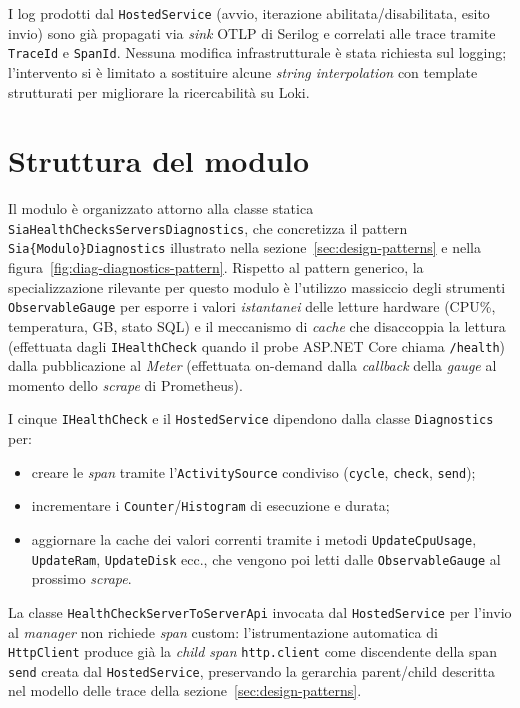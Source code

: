 I log prodotti dal \texttt{HostedService} (avvio, iterazione abilitata/disabilitata,
esito invio) sono già propagati via \emph{sink} OTLP di Serilog e correlati alle trace
tramite \texttt{TraceId} e \texttt{SpanId}. Nessuna modifica infrastrutturale è stata
richiesta sul logging; l'intervento si è limitato a sostituire alcune
\emph{string interpolation} con template strutturati per migliorare la ricercabilità su
Loki.

\section{Struttura del modulo}

Il modulo è organizzato attorno alla classe statica
\texttt{SiaHealthChecksServersDiagnostics}, che concretizza il pattern
\texttt{Sia\{Modulo\}Diagnostics} illustrato nella sezione~\ref{sec:design-patterns} e
nella figura~\ref{fig:diag-diagnostics-pattern}. Rispetto al pattern generico, la specializzazione
rilevante per questo modulo è l'utilizzo massiccio degli strumenti \texttt{ObservableGauge}
per esporre i valori \emph{istantanei} delle letture hardware (CPU\%, temperatura, GB,
stato SQL) e il meccanismo di \emph{cache} che disaccoppia la lettura (effettuata dagli
\texttt{IHealthCheck} quando il probe ASP.NET Core chiama \texttt{/health}) dalla
pubblicazione al \emph{Meter} (effettuata on-demand dalla \emph{callback} della \emph{gauge}
al momento dello \emph{scrape} di Prometheus).

I cinque \texttt{IHealthCheck} e il \texttt{HostedService} dipendono dalla classe
\texttt{Diagnostics} per:
\begin{itemize}
    \item creare le \emph{span} tramite l'\texttt{ActivitySource} condiviso (\texttt{cycle},
        \texttt{check}, \texttt{send});
    \item incrementare i \texttt{Counter}/\texttt{Histogram} di esecuzione e durata;
    \item aggiornare la cache dei valori correnti tramite i metodi
        \texttt{UpdateCpuUsage}, \texttt{UpdateRam}, \texttt{UpdateDisk} ecc., che vengono
        poi letti dalle \texttt{ObservableGauge} al prossimo \emph{scrape}.
\end{itemize}
La classe \texttt{HealthCheckServerToServerApi} invocata dal \texttt{HostedService} per
l'invio al \emph{manager} non richiede \emph{span} custom: l'istrumentazione automatica di
\texttt{HttpClient} produce già la \emph{child span} \texttt{http.client} come discendente
della span \texttt{send} creata dal \texttt{HostedService}, preservando la gerarchia
parent/child descritta nel modello delle trace della sezione~\ref{sec:design-patterns}.

